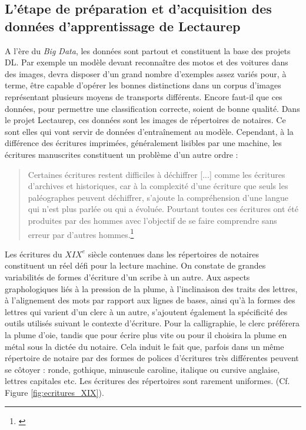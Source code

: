 \subsection{L'étape de préparation et d'acquisition des données d'apprentissage de Lectaurep}

A l'ère du \textit{Big Data}, les données sont partout et constituent la base des projets DL. Par exemple un modèle devant reconnaître des motos et des voitures dans des images, devra disposer d'un grand nombre d'exemples assez variés pour, à terme, être capable d'opérer les bonnes distinctions dans un corpus d'images représentant plusieurs moyens de transports différents. Encore faut-il que ces données, pour permettre une classification correcte, soient de bonne qualité. Dans le projet Lectaurep, ces données sont les images de répertoires de notaires. Ce sont elles qui vont servir de données d'entraînement au modèle. Cependant, à la différence des écritures imprimées, généralement lisibles par une machine, les écritures manuscrites constituent un problème d'un autre ordre : 
\begin{quote}
    Certaines écritures restent difficiles à déchiffrer [...] comme les écritures d'archives et historiques, car à la complexité d'une écriture que seuls les paléographes peuvent déchiffrer, s'ajoute la compréhension d'une langue qui n'est plus parlée ou qui a évoluée. Pourtant toutes ces écritures ont été produites par des hommes avec l'objectif de se faire comprendre sans erreur par d'autres hommes.\footnote{\cite{kermorvant_reconnaissance_2019}}
\end{quote}
Les écritures du $ XIX^{e}$ siècle contenues dans les répertoires de notaires constituent un réel défi pour la lecture machine. On constate de grandes variabilités de formes d'écriture d'un scribe à un autre. Aux aspects graphologiques liés à la pression de la plume, à l'inclinaison des traits des lettres, à l'alignement des mots par rapport aux lignes de bases, ainsi qu'à la formes des lettres qui varient d'un clerc à un autre, s'ajoutent également la spécificité des outils utilisés suivant le contexte d'écriture. Pour la calligraphie, le clerc préférera la plume d'oie, tandis que pour écrire plus vite ou pour  il choisira la plume en métal sous la dictée du notaire. Cela induit le fait que, parfois dans un même répertoire de notaire par des formes de polices d'écritures très différentes peuvent se côtoyer : ronde, gothique, minuscule caroline, italique ou cursive anglaise, lettres capitales etc. Les écritures des répertoires sont rarement uniformes. (Cf. Figure \ref{fig:ecritures_XIX}).
